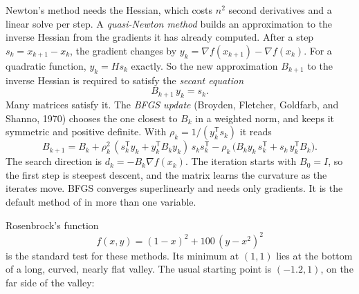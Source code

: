 Newton's method needs the Hessian, which costs \(n^2\) second derivatives and a
linear solve per step. A \emph{quasi-Newton method}
builds an approximation to the inverse Hessian from the gradients it has
already computed. After a step \(s_k = x_{k+1} - x_k\), the gradient changes by
\(y_k = \nabla f(x_{k+1}) - \nabla f(x_k)\). For a quadratic function,
\(y_k = H s_k\) exactly. So the new approximation \(B_{k+1}\) to the inverse
Hessian is required to satisfy the \emph{secant equation}
\[
  B_{k+1}\, y_k = s_k .
\]
Many matrices satisfy it. The \emph{BFGS update} (Broyden,
Fletcher, Goldfarb, and Shanno, 1970) chooses the one closest to \(B_k\) in a
weighted norm, and keeps it symmetric and positive definite. With
\(\rho_k = 1/(y_k^{\mathsf T} s_k)\) it reads
\[
  B_{k+1} = B_k
    + \rho_k^2\,(s_k^{\mathsf T} y_k + y_k^{\mathsf T} B_k y_k)\, s_k s_k^{\mathsf T}
    - \rho_k\,\bigl(B_k y_k\, s_k^{\mathsf T} + s_k\, y_k^{\mathsf T} B_k\bigr).
\]
The search direction is \(d_k = -B_k \nabla f(x_k)\). The iteration starts with
\(B_0 = I\), so the first step is steepest descent, and the matrix learns the
curvature as the iterates move. BFGS converges superlinearly and needs only
gradients. It is the default method of  in more than one
variable.


Rosenbrock's function
\[
  f(x, y) = (1 - x)^2 + 100\,(y - x^2)^2
\]
is the standard test for these methods. Its minimum at \((1,1)\) lies at the
bottom of a long, curved, nearly flat valley. The usual starting point is
\((-1.2, 1)\), on the far side of the valley:

